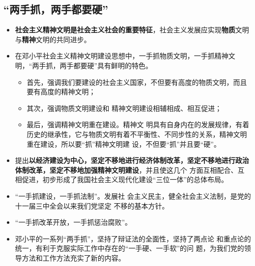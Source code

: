 \documentclass[12pt,openany]{ctexbook}
\begin{document}
\subsection{“两手抓，两手都要硬”}
\begin{itemize}
  \item \textbf{社会主义精神文明是社会主义社会的重要特征}，社会主义发展应实现\textbf{物质}文明与\textbf{精神}文明的共同进步。
  \item 在邓小平社会主义精神文明建设思想中，一手抓物质文明，一手抓精神文明，“两手抓，两手都要硬”具有鲜明的特色。
\begin{itemize}
  \item 首先，强调我们要建设的社会主义国家，不但要有高度的物质文明，而且要有高度的精神文明；
  \item 其次，强调物质文明建设和 精神文明建设相辅相成、相互促进；
  \item 最后，强调精神文明重在建设。精神文 明具有自身内在的发展规律，有着历史的继承性，它与物质文明有着不平衡性、不同步性的关系，精神文明重在建设，所以要“抓”精神文明建 设，不但要“抓”并且要“硬”。
\end{itemize}
  \item 提出\textbf{以经济建设为中心，坚定不移地进行经济体制改革，坚定不移地进行政治体制改革，坚定不移地加强精神文明建设}，并且使这几个 方面互相配合、互相促进，初步形成了我国社会主义现代化建设“三位一体”的总体布局。
  \item “一手抓建设，一手抓法制”。发展社 会主义民主，健全社会主义法制，是党的十一届三中全会以来我们党坚定 不移的基本方针。
  \item “一手抓改革开放，一手抓惩治腐败”。
  \item 邓小平的一系列“两手抓”，坚持了辩证法的全面性，坚持了两点论 和重点论的统一，有利于克服实际工作中存在的“一手硬、一手软”的问 题，为我们党的领导方法和工作方法充实了新的内容。
\end{itemize}
\end{document}
